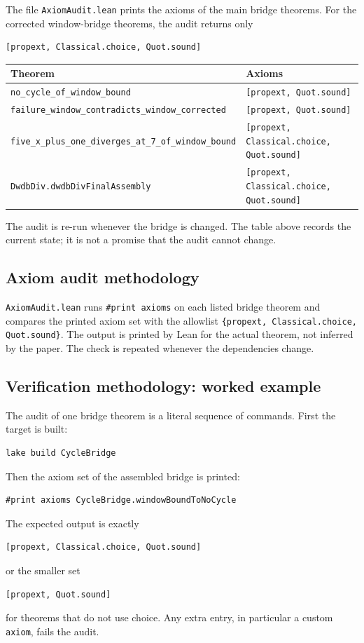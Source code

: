 The file \texttt{AxiomAudit.lean} prints the axioms of the main bridge
theorems.  For the corrected window-bridge theorems, the audit returns
only
\begin{verbatim}
[propext, Classical.choice, Quot.sound]
\end{verbatim}

\begin{center}
\small
\begin{tabular}{@{}p{}p{}@{}}
\toprule
Theorem & Axioms \\
\midrule
\texttt{no\_cycle\_of\_window\_bound} &
\texttt{[propext, Quot.sound]} \\
\texttt{failure\_window\_contradicts\_window\_corrected} &
\texttt{[propext, Quot.sound]} \\
\texttt{five\_x\_plus\_one\_diverges\_at\_7\_of\_window\_bound} &
\texttt{[propext, Classical.choice, Quot.sound]} \\
\texttt{DwdbDiv.dwdbDivFinalAssembly} &
\texttt{[propext, Classical.choice, Quot.sound]} \\
\bottomrule
\end{tabular}
\end{center}

The audit is re-run whenever the bridge is changed.  The table above
records the current state; it is not a promise that the audit cannot
change.

\subsection{Axiom audit methodology}

\texttt{AxiomAudit.lean} runs \texttt{\#print axioms} on each listed
bridge theorem and compares the printed axiom set with the allowlist
\texttt{\{propext, Classical.choice, Quot.sound\}}.  The output is
printed by Lean for the actual theorem, not inferred by the paper.  The
check is repeated whenever the dependencies change.

\subsection{Verification methodology: worked example}

The audit of one bridge theorem is a literal sequence of commands.
First the target is built:
\begin{verbatim}
lake build CycleBridge
\end{verbatim}
Then the axiom set of the assembled bridge is printed:
\begin{verbatim}
#print axioms CycleBridge.windowBoundToNoCycle
\end{verbatim}
The expected output is exactly
\begin{verbatim}
[propext, Classical.choice, Quot.sound]
\end{verbatim}
or the smaller set
\begin{verbatim}
[propext, Quot.sound]
\end{verbatim}
for theorems that do not use choice.  Any extra entry, in particular a
custom \texttt{axiom}, fails the audit.

